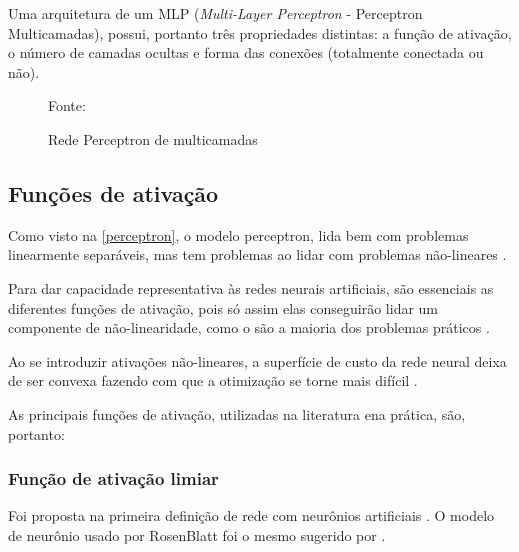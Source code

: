 Uma arquitetura de um MLP (\textit{Multi-Layer Perceptron} - Perceptron Multicamadas), possui, portanto três propriedades distintas: a função de ativação, o número de camadas ocultas e forma das conexões (totalmente conectada ou não).

\begin{figure}[h!]
	\centering
	\caption{Rede Perceptron de multicamadas}

	{\scriptsize 	Fonte: }
	\label{fig:pmc}
\end{figure}

\subsection{Funções de ativação}\label{funcoes_ativacao}
Como visto na \autoref{perceptron}, o modelo perceptron, lida bem com problemas linearmente separáveis, mas tem problemas ao lidar com problemas  não-lineares \cite{haykin_redes_2001}. 

Para dar capacidade representativa às redes neurais artificiais, são essenciais as diferentes funções de ativação, pois só assim elas conseguirão lidar um componente de não-linearidade, como o são a maioria dos problemas práticos \cite{hagan_neural_1996}.

Ao se introduzir ativações não-lineares, a superfície de custo da rede neural deixa de ser convexa fazendo com que a otimização se torne mais difícil \cite{minsky_perceptrons:_1969} \cite{haykin_redes_2001}.

As principais funções de ativação, utilizadas na literatura ena prática, são, portanto:

\subsubsection{Função de ativação limiar}\label{ativacao:limiar}
Foi proposta na primeira definição de rede com neurônios artificiais \cite{rosenblatt_perceptron:_1958}. O modelo de neurônio usado por RosenBlatt foi o mesmo sugerido por . 

